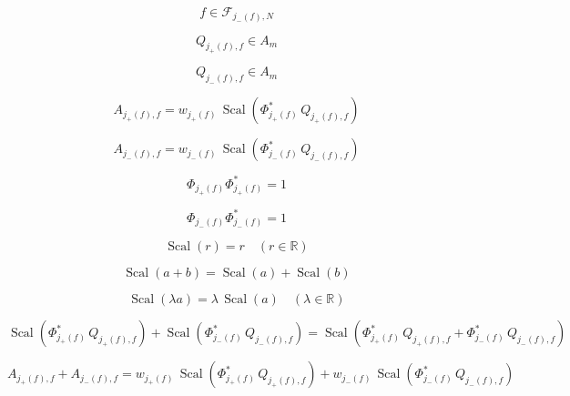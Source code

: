 \documentclass[12pt]{article}
\begin{document}
\begin{equation}
f\in\mathcal{F}_{j_-(f),N}
\end{equation}

\begin{equation}
Q_{j_+(f),f}\in A_m
\end{equation}

\begin{equation}
Q_{j_-(f),f}\in A_m
\end{equation}

\begin{equation}
A_{j_+(f),f}=w_{j_+(f)}\,\operatorname{Scal}\!\left(\Phi_{j_+(f)}^*\,Q_{j_+(f),f}\right)
\end{equation}

\begin{equation}
A_{j_-(f),f}=w_{j_-(f)}\,\operatorname{Scal}\!\left(\Phi_{j_-(f)}^*\,Q_{j_-(f),f}\right)
\end{equation}

\begin{equation}
\Phi_{j_+(f)}\Phi_{j_+(f)}^*=1
\end{equation}

\begin{equation}
\Phi_{j_-(f)}\Phi_{j_-(f)}^*=1
\end{equation}

\begin{equation}
\operatorname{Scal}(r)=r\quad (r\in\mathbb{R})
\end{equation}

\begin{equation}
\operatorname{Scal}(a+b)=\operatorname{Scal}(a)+\operatorname{Scal}(b)
\end{equation}

\begin{equation}
\operatorname{Scal}(\lambda a)=\lambda\,\operatorname{Scal}(a)\quad (\lambda\in\mathbb{R})
\end{equation}

\begin{equation}
\operatorname{Scal}\!\left(\Phi_{j_+(f)}^*\,Q_{j_+(f),f}\right)+\operatorname{Scal}\!\left(\Phi_{j_-(f)}^*\,Q_{j_-(f),f}\right)
=\operatorname{Scal}\!\left(\Phi_{j_+(f)}^*\,Q_{j_+(f),f}+\Phi_{j_-(f)}^*\,Q_{j_-(f),f}\right)
\end{equation}

\begin{equation}
A_{j_+(f),f}+A_{j_-(f),f}
=w_{j_+(f)}\,\operatorname{Scal}\!\left(\Phi_{j_+(f)}^*\,Q_{j_+(f),f}\right)+w_{j_-(f)}\,\operatorname{Scal}\!\left(\Phi_{j_-(f)}^*\,Q_{j_-(f),f}\right)
\end{equation}
\end{document}
